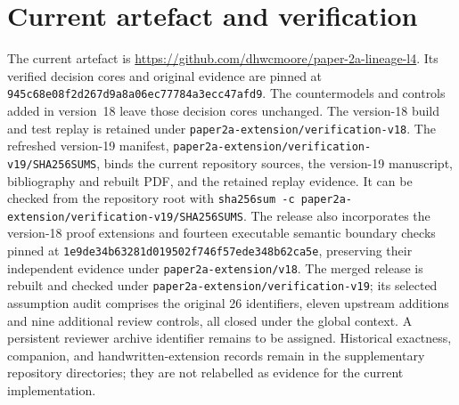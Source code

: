 \documentclass[smallextended,envcountsect,envcountsame,natbib]{svjour3}
\newcommand{\code}[1]{\texttt{#1}}
\begin{document}
\section{Current artefact and verification}\label{ex:app:verification}
\label{ex:app:extension}\label{ex:app:mechanisation}

The current artefact is \url{https://github.com/dhwcmoore/paper-2a-lineage-l4}. Its verified decision cores and original evidence are pinned at \nolinkurl{945c68e08f2d267d9a8a06ec77784a3ecc47afd9}. The countermodels and controls added in version~18 leave those decision cores unchanged. The version-18 build and test replay is retained under \nolinkurl{paper2a-extension/verification-v18}. The refreshed version-19 manifest, \nolinkurl{paper2a-extension/verification-v19/SHA256SUMS}, binds the current repository sources, the version-19 manuscript, bibliography and rebuilt PDF, and the retained replay evidence. It can be checked from the repository root with \code{sha256sum -c paper2a-extension/verification-v19/SHA256SUMS}. The release also incorporates the version-18 proof extensions and fourteen executable semantic boundary checks pinned at \nolinkurl{1e9de34b63281d019502f746f57ede348b62ca5e}, preserving their independent evidence under \nolinkurl{paper2a-extension/v18}. The merged release is rebuilt and checked under \nolinkurl{paper2a-extension/verification-v19}; its selected assumption audit comprises the original 26 identifiers, eleven upstream additions and nine additional review controls, all closed under the global context. A persistent reviewer archive identifier remains to be assigned. Historical exactness, companion, and handwritten-extension records remain in the supplementary repository directories; they are not relabelled as evidence for the current implementation.
\end{document}
